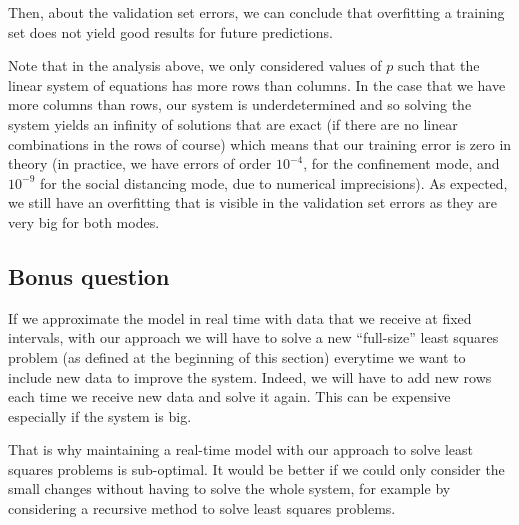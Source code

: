 \documentclass[11pt]{article}
\begin{document}
Then, about the validation set errors, we can conclude that overfitting a training set does not yield good results for future predictions.

Note that in the analysis above, we only considered values of \(p\) such that the linear system of equations has more rows than columns.
In the case that we have more columns than rows, our system is underdetermined and so solving the system yields an infinity of solutions that are exact (if there are no linear combinations in the rows of course) which means that our training error is zero in theory (in practice, we have errors of order $10^{-4}$, for the confinement mode, and $10^{-9}$ for the social distancing mode, due to numerical imprecisions). As expected, we still have an overfitting that is visible in the validation set errors as they are very big for both modes.

\subsection*{Bonus question}
If we approximate the model in real time with data that we receive at fixed intervals, with our approach we will have to solve a new ``full-size'' least squares problem (as defined at the beginning of this section) everytime we want to include new data to improve the system. Indeed, we will have to add new rows each time we receive new data and solve it again. This can be expensive especially if the system is big.

That is why maintaining a real-time model with our approach to solve least squares problems is sub-optimal. It would be better if we could only consider the small changes without having to solve the whole system, for example by considering a recursive method to solve least squares problems.
\end{document}

